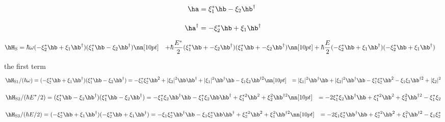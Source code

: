 \begin{align}
    \ha&=\xi_1^{\ast}\hb-\xi_2\hb^\dag\\[10pt]
     \ha^\dag&=-\xi_2^{\ast}\hb+\xi_1\hb^\dag
\end{align}


\begin{align}
    \hH_{\rm{S}}&=\hbar\omega(-\xi_2^{\ast}\hb+\xi_1\hb^\dag)(\xi_1^{\ast}\hb-\xi_2\hb^\dag)\nn[10pt]
    &+ \hbar\frac{E^\ast}{2}(\xi_1^{\ast}\hb+-\xi_2\hb^\dag)(\xi_1^{\ast}\hb+-\xi_2\hb^\dag)\nn[10pt]
    &+ \hbar\frac{E}{2}(-\xi_2^{\ast}\hb+\xi_1\hb^\dag)(-\xi_2^{\ast}\hb+\xi_1\hb^\dag)
\end{align}

the first term
\begin{align}
    \hH_{\rm{S}1}/(\hbar\omega)&=(-\xi_2^{\ast}\hb+\xi_1\hb^\dag)(\xi_1^{\ast}\hb-\xi_2\hb^\dag)
    =-\xi_1^{\ast}\xi_2^{\ast}\hb^2 +|\xi_2|^2\hb\hb^\dag
    +|\xi_1|^2\hb^\dag\hb-\xi_1\xi_2\hb^{\dag2}\nn[10pt]
    &=|\xi_1|^2\hb^\dag\hb
    +|\xi_2|^2\hb^\dag\hb
    -\xi_1^{\ast}\xi_2^{\ast}\hb^2 -\xi_1\xi_2\hb^{\dag2}+|\xi_2|^2
\end{align}

\begin{align}
    \hH_{\rm{S}2}/(\hbar E^{\ast}/2)&=(\xi_1^{\ast}\hb-\xi_2\hb^\dag)(\xi_1^{\ast}\hb-\xi_2\hb^\dag)
    =-\xi_1^{\ast}\xi_2\hb^\dag\hb-\xi_1^{\ast}\xi_2\hb\hb^\dag
    +\xi_1^{\ast2}\hb^2+\xi_2^{2}\hb^{\dag2}\nn[10pt]
    &=-2\xi_1^{\ast}\xi_2\hb^\dag\hb
    +\xi_1^{\ast2}\hb^2+\xi_2^{2}\hb^{\dag2}-\xi_1^{\ast}\xi_2
\end{align}


\begin{align}
    \hH_{\rm{S}3}/(\hbar E/2)
    &=(-\xi_2^{\ast}\hb+\xi_1\hb^\dag)(-\xi_2^{\ast}\hb+\xi_1\hb^\dag)
    =-\xi_1\xi_2^{\ast}\hb^\dag\hb-\xi_1\xi_2^{\ast}\hb\hb^\dag
    +\xi_2^{\ast2}\hb^2+\xi_1^{2}\hb^{\dag2}\nn[10pt]
    &=-2\xi_1\xi_2^{\ast}\hb^\dag\hb
    +\xi_2^{\ast2}\hb^2+\xi_1^{2}\hb^{\dag2}-\xi_1\xi_2^{\ast}
\end{align}

